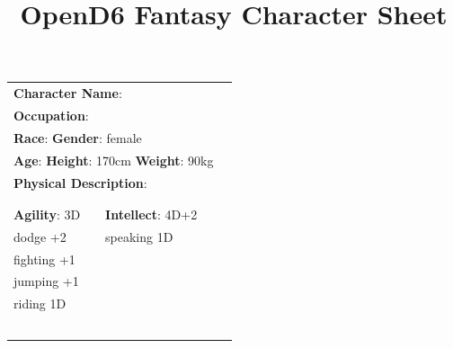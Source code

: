 \documentclass[10pt]{article}
\title{OpenD6 Fantasy Character Sheet}
\begin{document}
\pagestyle{fancy}
\fancyhf{}
\fancyfoot[R]{\thepage}
\renewcommand{\headrulewidth}{0pt}


\cleardoublepage
\begin{table}
\begin{tabular}{m{156pt} m{156pt} m{156pt}}
    \multicolumn{2}{l}{\textbf{Character Name}:  \hrulefill} \\
    \multicolumn{2}{l}{\textbf{Occupation}:  \hrulefill} \\
    \multicolumn{2}{l}{\textbf{Race}:  \hrulefill \hspace{1em} \textbf{Gender}: female \hrulefill} \\
    \multicolumn{2}{l}{\textbf{Age}:  \hrulefill \hspace{1em} \textbf{Height}: 170cm \hrulefill \hspace{1em}  \textbf{Weight}: 90kg \hrulefill } \\
    \multicolumn{2}{l}{\textbf{Physical Description}:  \hrulefill } \\
    \multicolumn{2}{l}{ \hrulefill } \\
 & & \\
\textbf{Agility}: 3D \hrulefill      & \textbf{Intellect}: 4D+2 \hrulefill  &                             \\

dodge             +2 \hrulefill & speaking          1D \hrulefill & \\

fighting          +1 \hrulefill &  \hrulefill & \\

jumping           +1 \hrulefill &  \hrulefill & \\

riding            1D \hrulefill &  \hrulefill & \\

 \hrulefill &  \hrulefill & \\

 \hrulefill &  \hrulefill & \\

 \hrulefill &  \hrulefill & \\

 \hrulefill &  \hrulefill & \\

 \hrulefill &  \hrulefill & \\


\end{tabular}
\end{table}
\end{document}

